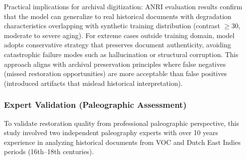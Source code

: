 \documentclass[journal]{IEEEtran}
\begin{document}
Practical implications for archival digitization: ANRI evaluation results confirm that the model can generalize to real historical documents with degradation characteristics overlapping with synthetic training distribution (contrast $\geq$30, moderate to severe aging). For extreme cases outside training domain, model adopts conservative strategy that preserves document authenticity, avoiding catastrophic failure modes such as hallucination or structural corruption. This approach aligns with archival preservation principles where false negatives (missed restoration opportunities) are more acceptable than false positives (introduced artifacts that mislead historical interpretation).

\subsubsection{Expert Validation (Paleographic Assessment)}

To validate restoration quality from professional paleographic perspective, this study involved two independent paleography experts with over 10 years experience in analyzing historical documents from VOC and Dutch East Indies periods (16th--18th centuries).
\end{document}
